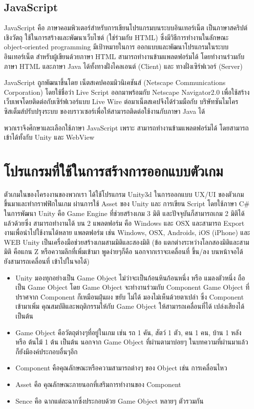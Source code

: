 \subsection{JavaScript}
JavaScript คือ ภาษาคอมพิวเตอร์สำหรับการเขียนโปรแกรมบนระบบอินเทอร์เน็ต 
เป็นภาษาสคริปต์เชิงวัตถุ ใช้ในการสร้างและพัฒนาเว็บไซต์ (ใช่ร่วมกับ HTML) 
ซึ่งมีวิธีการทำงานในลักษณะ object-oriented programming มีเป้าหมายในการ 
ออกแบบและพัฒนาโปรแกรมในระบบอินเทอร์เน็ต สำหรับผู้เขียนด้วยภาษา HTML 
สามารถทำงานข้ามแพลตฟอร์มได้ โดยทำงานร่วมกับ ภาษา HTML และภาษา Java 
ได้ทั้งทางฝั่งไคลเอนต์ (Client) และ ทางฝั่งเซิร์ฟเวอร์ (Server)\par
JavaScript ถูกพัฒนาขึ้นโดย เน็ตสเคปคอมมิวนิเคชันส์ 
(Netscape Communications Corporation) 
โดยใช้ชื่อว่า Live Script ออกมาพร้อมกับ Netscape Navigator2.0 
เพื่อใช้สร้างเว็บเพจโดยติดต่อกับเซิร์ฟเวอร์แบบ Live Wire 
ต่อมาเน็ตสเคปจึงได้ร่วมมือกับ บริษัทซันไมโครซิสเต็มส์ปรับปรุงระบบ
ของบราวเซอร์เพื่อให้สามารถติดต่อใช้งานกับภาษา Java ได้~\cite{js}\par
พวกเราจึงศึกษาและเลือกใช้ภาษา JavaScript เพราะ 
สามารถทำงานข้ามแพลตฟอร์มได้ โดยสามารถเข้าได้ทั้งกับ Unity และ WebView

\section{โปรแกรมที่ใช้ในการสร้างการออกแบบตัวเกม}
ตัวเกมในของโครงงานของพวกเรา ได้ใช้โปรแกรม Unity3d
ในการออกแบบ UX/UI ของตัวเกมขึ้นมาและทำกราฟฟิกในเกม 
ผ่านการใช้ Asset ของ Unity และ การเขียน Script 
โดยใช้ภาษา C\# ในการพัฒนา\newline
Unity คือ Game Engine ที่ช่วยสร้างเกม 3 มิติ 
และปัจจุบันก็สามารถเกม 2 มิติได้แล้วด้วยซึ่ง 
สามารถทำงานได้ บน 2 แพลตฟอร์ม คือ Windows และ OSX 
และสามารถ Export งานเพื่อนำไปใช้งานได้หลาย แพลตฟอร์ม 
เช่น Windows, OSX, Androids, iOS (iPhone) และ WEB\newline
Unity เป็นเครื่องมือช่วยสร้างเกมสามมิติและสองมิติ 
(ข้อ แตกต่างระหว่างโลกสองมิติและสามมิติ คือแกน Z หรือความลึกที่เพิ่มเข้ามา 
พูดง่ายๆก็คือ นอกจากเราจะเคลื่อนที่ ขึ้น/ลง บนหน้าจอได้ ยังสามารถเคลื่อนที่ 
เข้าไปในจอได้)~\cite{unth}
\begin{itemize}
  \item Unity มองทุกอย่างเป็น Game Object ไม่ว่าจะเป็นก้อนหินก้อนหนึ่ง 
  หรือ แมลงตัวหนึ่ง ถือเป็น Game Object โดย Game Object 
  จะทำงานร่วมกับ Component Game Object ที่ปราศจาก Component 
  ก็เหมือนฝุ่นผง ขยับ ไม่ได้ มองไม่เห็นด้วยตาเปล่า ซึ่ง Component 
  เข้ามาเพิ่ม คุณสมบัติและพฤติกรรมให้กับ Game Object ให้สามารถเคลื่อนที่ได้ 
  เปล่งเสียงได้ เป็นต้น
  \item Game Object คือวัตถุต่างๆที่อยู่ในเกม 
  เช่น รถ 1 คัน, สัตว์ 1 ตัว, คน 1 คน, บ้าน 1 หลัง หรือ ต้นไม้ 1 ต้น เป็นต้น 
  นอกจาก Game Object ที่ผ่านตามาบ่อยๆ ในบทความที่ผ่านมาแล้ว 
  ก็ยังมีองค์ประกอบอื่นๆอีก
  \item Component คือคุณลักษณะหรือความสามารถต่างๆ ของ Object เช่น การเคลื่อนไหว
  \item Asset คือ คุณลักษณะภายนอกที่เสริมการทำงานของ Component
  \item Sence คือ ฉากแต่ละฉากซึ่งประกอบด้วย Game Object หลายๆ ตัวรวมกัน
\end{itemize}

